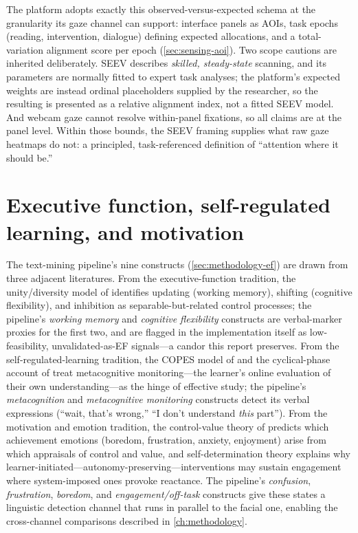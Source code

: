 The platform adopts exactly this observed-versus-expected schema at the
granularity its gaze channel can support: interface panels as AOIs,
task epochs (reading, intervention, dialogue) defining expected
allocations, and a total-variation alignment score per epoch
(\cref{sec:sensing-aoi}). Two scope cautions are inherited deliberately.
SEEV describes \emph{skilled, steady-state} scanning, and its parameters
are normally fitted to expert task analyses; the platform's expected
weights are instead ordinal placeholders supplied by the researcher, so
the resulting \allocscore{} is presented as a relative alignment index,
not a fitted SEEV model. And webcam gaze cannot resolve within-panel
fixations, so all claims are at the panel level. Within those bounds, the
SEEV framing supplies what raw gaze heatmaps do not: a principled,
task-referenced definition of ``attention where it should be.''

\section{Executive function, self-regulated learning, and motivation}
\label{sec:bg-ef}

The text-mining pipeline's nine constructs (\cref{sec:methodology-ef})
are drawn from three adjacent literatures. From the executive-function
tradition, the unity/diversity model of \citet{miyake2000, miyake2012}
identifies updating (working memory), shifting (cognitive flexibility),
and inhibition as separable-but-related control processes; the pipeline's
\emph{working memory} and \emph{cognitive flexibility} constructs are
verbal-marker proxies for the first two, and are flagged in the
implementation itself as low-feasibility, unvalidated-as-EF signals---a
candor this report preserves. From the self-regulated-learning tradition,
the COPES model of \citet{winne1998} and the cyclical-phase account of
\citet{zimmerman2002} treat metacognitive monitoring---the learner's
online evaluation of their own understanding---as the hinge of effective
study; the pipeline's \emph{metacognition} and \emph{metacognitive
monitoring} constructs detect its verbal expressions (``wait, that's
wrong,'' ``I don't understand \emph{this} part''). From the motivation
and emotion tradition, the control-value theory of \citet{pekrun2006}
predicts which achievement emotions (boredom, frustration, anxiety,
enjoyment) arise from which appraisals of control and value, and
self-determination theory \citep{ryan2000} explains why
learner-initiated---autonomy-preserving---interventions may sustain
engagement where system-imposed ones provoke reactance. The pipeline's
\emph{confusion}, \emph{frustration}, \emph{boredom}, and
\emph{engagement/off-task} constructs give these states a linguistic
detection channel that runs in parallel to the facial one, enabling the
cross-channel comparisons described in \cref{ch:methodology}.

